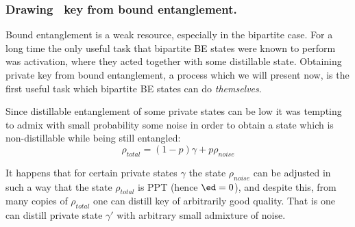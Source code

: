 \documentclass[rmp,12pt,preprint]{revtex4-2}
\begin{document}
\subsubsection{Drawing \secure\ key from bound entanglement.}
\label{subsubsec:pptkey} Bound entanglement is a weak resource,
especially in the bipartite case. For a long time the only useful
task that bipartite BE states were known to perform was activation,
where they acted together with some distillable state. Obtaining
private key from bound entanglement, a process which we will present
now, is the first useful task which bipartite BE states can do {\it
themselves}.

Since distillable entanglement of some private states can be low it
was tempting to admix with small probability some noise in order to
obtain a state which is non-distillable while being still entangled:
\begin{equation} \rho_{total} = (1-p)\gamma + p\rho_{noise} \end{equation}

It happens that for certain private states $\gamma$ the state $\rho_{noise}$ can be adjusted in such a way that the state $\rho_{total}$ is PPT (hence $\ed=0$), and despite this, from many copies of $\rho_{total}$ one can distill key of arbitrarily good quality. That is one can distill private state $\gamma'$ with arbitrary small
admixture of noise.
\end{document}
